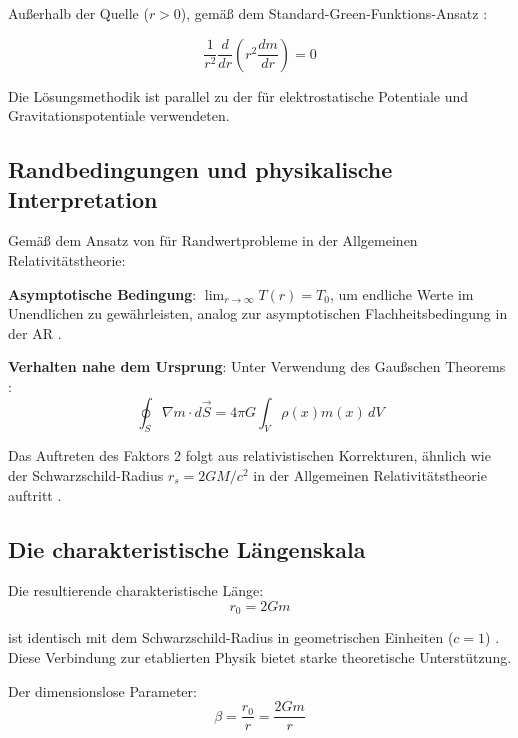 \documentclass[12pt,a4paper]{article}
\begin{document}
	Außerhalb der Quelle ($r > 0$), gemäß dem Standard-Green-Funktions-Ansatz \citep{jackson1998}:
	
	\begin{equation}
		\frac{1}{r^2}\frac{d}{dr}\left(r^2 \frac{dm}{dr}\right) = 0
	\end{equation}
	
	Die Lösungsmethodik ist parallel zu der für elektrostatische Potentiale \citep{griffiths1999} und Gravitationspotentiale \citep{binney2008} verwendeten.
	
	\subsection{Randbedingungen und physikalische Interpretation}
	\label{subsec:boundary_conditions}
	
	Gemäß dem Ansatz von \citet{misner1973} für Randwertprobleme in der Allgemeinen Relativitätstheorie:
	
	\textbf{Asymptotische Bedingung}: $\lim_{r \to \infty} T(r) = T_0$, um endliche Werte im Unendlichen zu gewährleisten, analog zur asymptotischen Flachheitsbedingung in der AR \citep{carroll2004}.
	
	\textbf{Verhalten nahe dem Ursprung}: Unter Verwendung des Gaußschen Theorems \citep{griffiths1999,jackson1998}:
	\begin{equation}
		\oint_S \nabla m \cdot d\vec{S} = 4\pi G \int_V \rho(x) m(x) \, dV
	\end{equation}
	
	Das Auftreten des Faktors 2 folgt aus relativistischen Korrekturen, ähnlich wie der Schwarzschild-Radius $r_s = 2GM/c^2$ in der Allgemeinen Relativitätstheorie auftritt \citep{schwarzschild1916,misner1973}.
	
	\subsection{Die charakteristische Längenskala}
	\label{subsec:characteristic_length}
	
	Die resultierende charakteristische Länge:
	\begin{equation}
		\boxed{r_0 = 2Gm}
	\end{equation}
	
	ist identisch mit dem Schwarzschild-Radius in geometrischen Einheiten ($c = 1$) \citep{misner1973,carroll2004}. Diese Verbindung zur etablierten Physik bietet starke theoretische Unterstützung.
	
	Der dimensionslose Parameter:
	\begin{equation}
		\boxed{\beta = \frac{r_0}{r} = \frac{2Gm}{r}}
	\end{equation}
	
\end{document}
